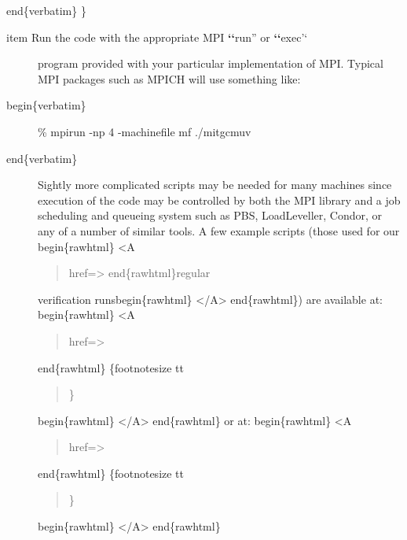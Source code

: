 \documentclass[letterpaper,10pt,english]{sphinxmanual}
\begin{document}
end\{verbatim\} \}
\begin{description}
\item[{item Run the code with the appropriate MPI {\color{red}\bfseries{}{}`{}`}run'' or {\color{red}\bfseries{}{}`{}`}exec'`}] \leavevmode
program provided with your particular implementation of MPI.
Typical MPI packages such as MPICH will use something like:

\item[{begin\{verbatim\}}] \leavevmode
\%  mpirun -np 4 -machinefile mf ./mitgcmuv

\item[{end\{verbatim\}}] \leavevmode
Sightly more complicated scripts may be needed for many machines
since execution of the code may be controlled by both the MPI
library and a job scheduling and queueing system such as PBS,
LoadLeveller, Condor, or any of a number of similar tools.  A few
example scripts (those used for our begin\{rawhtml\} \textless{}A
\begin{quote}

href=\sphinxquotedblright{}\sphinxquotedblleft{}\textgreater{} end\{rawhtml\}regular
\end{quote}

verification runsbegin\{rawhtml\} \textless{}/A\textgreater{} end\{rawhtml\}) are available
at:
begin\{rawhtml\} \textless{}A
\begin{quote}

href=\sphinxquotedblright{}\sphinxquotedblleft{}\textgreater{}
\end{quote}

end\{rawhtml\}
\{footnotesize tt
\begin{quote}

 \}
\end{quote}

begin\{rawhtml\} \textless{}/A\textgreater{} end\{rawhtml\}
or at:
begin\{rawhtml\} \textless{}A
\begin{quote}

href=\sphinxquotedblright{}\sphinxquotedblleft{}\textgreater{}
\end{quote}

end\{rawhtml\}
\{footnotesize tt
\begin{quote}

 \}
\end{quote}

begin\{rawhtml\} \textless{}/A\textgreater{} end\{rawhtml\}

\end{description}
\end{document}

